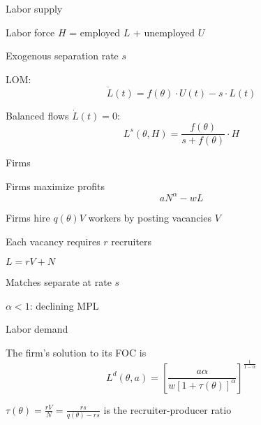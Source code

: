 \documentclass[aspectratio=169]{beamer}
\newenvironment{wideitemize}{\itemize\addtolength{\itemsep}{10pt}}{\enditemize}
\begin{document}
\begin{frame}{Labor supply}
    \begin{wideitemize}
        \item Labor force $H$ = employed $L$ + unemployed $U$
        \item Exogenous separation rate $s$
        \item LOM:
        \begin{equation*}
            \dot L(t) = f(\theta) \cdot U(t) - s \cdot L(t)
        \end{equation*}
        \item Balanced flows $\dot L(t) = 0$:
        \begin{equation*}
            L^{s}(\theta, H) = \frac{f(\theta)}{s + f(\theta)} \cdot H
        \end{equation*}
    \end{wideitemize}
\end{frame}

\begin{frame}{Firms}
    \begin{wideitemize}
        \item Firms maximize profits
            \begin{equation*}
                a N^\alpha - w L
            \end{equation*}
        \item Firms hire $q(\theta)V$ workers by posting vacancies $V$
        \item Each vacancy requires $r$ recruiters
        \item $L = rV + N$
        \item Matches separate at rate $s$
        \item $\alpha < 1$: declining MPL
    \end{wideitemize}
\end{frame}

\begin{frame}{Labor demand}
    \begin{wideitemize}
        \item The firm's solution to its FOC is
        \begin{equation*}
            L^d(\theta, a) = \left[ \frac{a \alpha}{w [1 + \tau(\theta)]^\alpha} \right]^{\frac{1}{1-\alpha}}
        \end{equation*}
        \item $\tau(\theta) = \frac{rV}{N} = \frac{rs}{q(\theta) - rs}$ is the recruiter-producer ratio
    \end{wideitemize}
\end{frame}
\end{document}

